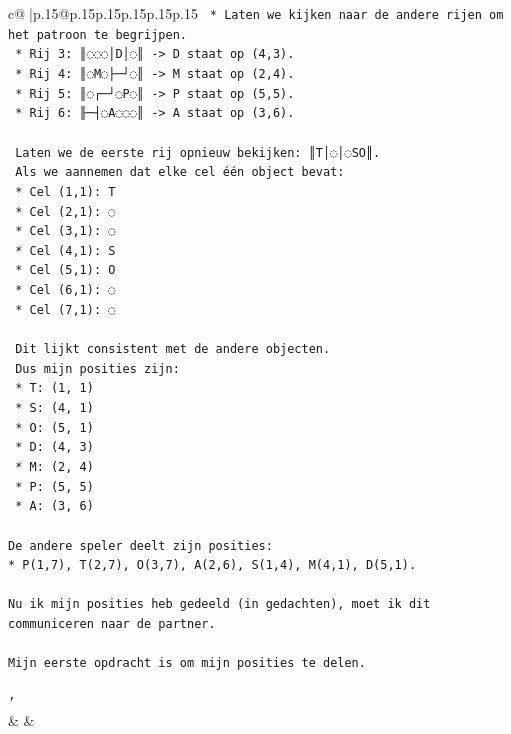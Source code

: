 \documentclass{article}
\begin{document}
{\begin{supertabular}{c@{$\;$}|p{.15\linewidth}@{}p{.15\linewidth}p{.15\linewidth}p{.15\linewidth}p{.15\linewidth}p{.15\linewidth}}
{{{\texttt{        *   Laten we kijken naar de andere rijen om het patroon te begrijpen.} \\
\texttt{        *   Rij 3: ║◌◌◌│D│◌║ {-}> D staat op (4,3).} \\
\texttt{        *   Rij 4: ║◌M◌├─┘◌║ {-}> M staat op (2,4).} \\
\texttt{        *   Rij 5: ║◌┌─┘◌P◌║ {-}> P staat op (5,5).} \\
\texttt{        *   Rij 6: ╟─┤◌A◌◌◌║ {-}> A staat op (3,6).} \\
\\ 
\texttt{    Laten we de eerste rij opnieuw bekijken: ║T│◌│◌SO║.} \\
\texttt{    Als we aannemen dat elke cel één object bevat:} \\
\texttt{    *   Cel (1,1): T} \\
\texttt{    *   Cel (2,1): ◌} \\
\texttt{    *   Cel (3,1): ◌} \\
\texttt{    *   Cel (4,1): S} \\
\texttt{    *   Cel (5,1): O} \\
\texttt{    *   Cel (6,1): ◌} \\
\texttt{    *   Cel (7,1): ◌} \\
\\ 
\texttt{    Dit lijkt consistent met de andere objecten.} \\
\texttt{    Dus mijn posities zijn:} \\
\texttt{    *   T: (1, 1)} \\
\texttt{    *   S: (4, 1)} \\
\texttt{    *   O: (5, 1)} \\
\texttt{    *   D: (4, 3)} \\
\texttt{    *   M: (2, 4)} \\
\texttt{    *   P: (5, 5)} \\
\texttt{    *   A: (3, 6)} \\
\\ 
\texttt{De andere speler deelt zijn posities:} \\
\texttt{*   P(1,7), T(2,7), O(3,7), A(2,6), S(1,4), M(4,1), D(5,1).} \\
\\ 
\texttt{Nu ik mijn posities heb gedeeld (in gedachten), moet ik dit communiceren naar de partner.} \\
\\ 
\texttt{Mijn eerste opdracht is om mijn posities te delen.} \\
\\ 
\texttt{'} \\
            }
        }
    }
    & & \\ \\


\end{supertabular}}
\end{document}
